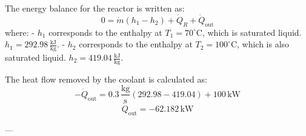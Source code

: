 The energy balance for the reactor is written as:  
\[
0 = \dot{m} (h_1 - h_2) + \dot{Q}_R + \dot{Q}_{\text{out}}
\]  
where:  
- \( h_1 \) corresponds to the enthalpy at \( T_1 = 70^\circ\text{C} \), which is saturated liquid.  
  \( h_1 = 292.98 \, \frac{\text{kJ}}{\text{kg}} \).  
- \( h_2 \) corresponds to the enthalpy at \( T_2 = 100^\circ\text{C} \), which is also saturated liquid.  
  \( h_2 = 419.04 \, \frac{\text{kJ}}{\text{kg}} \).  

The heat flow removed by the coolant is calculated as:  
\[
-\dot{Q}_{\text{out}} = 0.3 \, \frac{\text{kg}}{\text{s}} \left( 292.98 - 419.04 \right) + 100 \, \text{kW}
\]  
\[
\dot{Q}_{\text{out}} = -62.182 \, \text{kW}
\]  

---